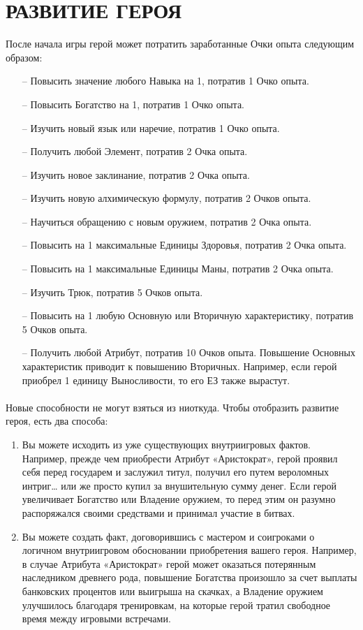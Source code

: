 \section{РАЗВИТИЕ ГЕРОЯ}
После начала игры герой может потратить заработанные Очки опыта следующим образом:
\begin{itemize}
\item[--] Повысить значение любого Навыка на 1, потратив 1 Очко опыта.
\item[--] Повысить Богатство на 1, потратив 1 Очко опыта.
\item[--] Изучить новый язык или наречие, потратив 1 Очко опыта.
\item[--] Получить любой Элемент, потратив 2 Очка опыта.
\item[--] Изучить новое заклинание, потратив 2 Очка опыта.
\item[--] Изучить новую алхимическую формулу, потратив 2 Очков опыта.
\item[--] Научиться обращению с новым оружием, потратив 2 Очка опыта.
\item[--] Повысить на 1 максимальные Единицы Здоровья, потратив 2 Очка опыта.
\item[--] Повысить на 1 максимальные Единицы Маны, потратив 2 Очка опыта.
\item[--] Изучить Трюк, потратив 5 Очков опыта.
\item[--] Повысить на 1 любую Основную или Вторичную характеристику, потратив 5 Очков опыта.
\item[--] Получить любой Атрибут, потратив 10 Очков опыта.
Повышение Основных характеристик приводит к повышению
Вторичных. Например, если герой приобрел 1 единицу Выносливости, то его ЕЗ также вырастут.
\end{itemize}
\paragraph{}
Новые способности не могут взяться из ниоткуда. Чтобы отобразить развитие героя, есть два способа:
\begin{enumerate}
\item Вы можете исходить из уже существующих внутриигровых фактов. Например, прежде чем приобрести Атрибут «Аристократ», герой проявил себя перед государем и заслужил титул, получил его путем вероломных интриг… или же просто купил за внушительную сумму денег. Если герой увеличивает Богатство или Владение оружием, то перед этим он разумно распоряжался своими средствами и принимал участие в битвах.
\item Вы можете создать факт, договорившись с мастером и соигроками о логичном внутриигровом обосновании приобретения вашего героя. Например, в случае Атрибута «Аристократ» герой может оказаться потерянным наследником древнего рода, повышение Богатства произошло за счет выплаты банковских процентов или выигрыша на скачках, а Владение оружием улучшилось благодаря тренировкам, на которые герой тратил свободное время между игровыми встречами.
\end{enumerate}